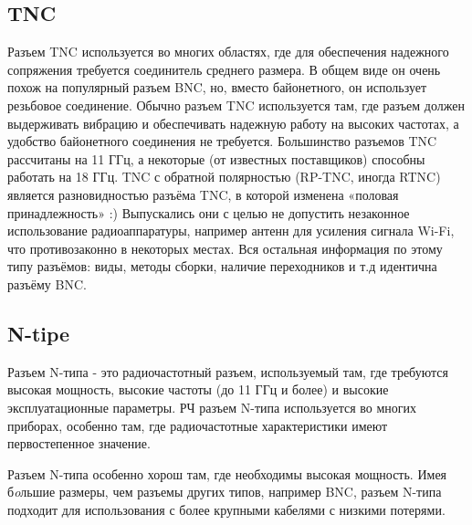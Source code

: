 \documentclass[%
	11pt,
	a4paper,
	utf8,
		]{article}
\begin{document}
\subsection{TNC}
Разъем TNC используется во многих областях, где для обеспечения надежного сопряжения требуется соединитель среднего размера. В общем виде он очень похож на популярный разъем BNC, но, вместо байонетного, он использует резьбовое соединение. Обычно разъем TNC используется там, где разъем должен выдерживать вибрацию и обеспечивать надежную работу на высоких частотах, а удобство байонетного соединения не требуется. Большинство разъемов TNC рассчитаны на 11 ГГц, а некоторые (от известных поставщиков) способны работать на 18 ГГц.
TNC с обратной полярностью (RP-TNC, иногда RTNC) является разновидностью разъёма TNC, в которой изменена «половая принадлежность» :) Выпускались они с целью не допустить незаконное использование радиоаппаратуры, например антенн для усиления сигнала Wi-Fi, что противозаконно в некоторых местах.
Вся остальная информация по этому типу разъёмов: виды, методы сборки, наличие переходников и т.д идентична разъёму BNC.

\subsection{N-tipe}
Разъем N-типа - это радиочастотный разъем, используемый там, где требуются высокая мощность, высокие частоты (до 11 ГГц и более) и высокие эксплуатационные параметры.
РЧ разъем N-типа используется во многих приборах, особенно там, где радиочастотные характеристики имеют первостепенное значение.

Разъем N-типа особенно хорош там, где необходимы высокая мощность. Имея б\'{\itshape o}льшие размеры, чем разъемы других типов, например BNC, разъем N-типа подходит для использования с более крупными кабелями с низкими потерями.
\end{document}
